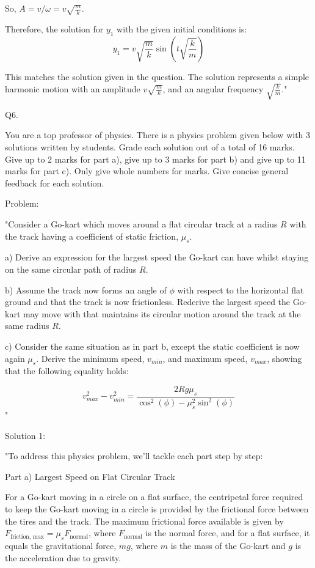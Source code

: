 So, \( A = v / \omega = v \sqrt{\frac{m}{k}} \).

Therefore, the solution for \( y_1 \) with the given initial conditions is:
\[ y_1 = v \sqrt{\frac{m}{k}} \sin(t \sqrt{\frac{k}{m}}) \]

This matches the solution given in the question. The solution represents a simple harmonic motion with an amplitude \( v \sqrt{\frac{m}{k}} \), and an angular frequency \( \sqrt{\frac{k}{m}} \)."



                           Q6. 

You are a top professor of physics. There is a physics problem given below with 3 solutions written by students. Grade each solution out of a total of 16 marks. Give up to 2 marks for part a), give up to 3 marks for part b) and give up to 11 marks for part c). Only give whole numbers for marks. Give concise general feedback for each solution.

Problem: 

"Consider a Go-kart which moves around a flat circular track at a radius \( R \) with the track having a coefficient of static friction, \( \mu_{s} \). 

a) Derive an expression for the largest speed the Go-kart can have whilst staying on the same circular path of radius \( R \). 
    
b) Assume the track now forms an angle of \( \phi \) with respect to the horizontal flat ground and that the track is now frictionless. Rederive the largest speed the Go-kart may move with that maintains its circular motion around the track at the same radius \( R \). 
    
c) Consider the same situation as in part b, except the static coefficient is now again \( \mu_{s} \). Derive the minimum speed, \( v_{min} \), and maximum speed, \( v_{max} \), showing that the following equality holds:
    
\[ 
v_{max}^{2} - v_{min}^{2} = \frac{2Rg\mu_{s}}{\cos^{2}(\phi) - \mu_{s}^{2}\sin^{2}(\phi)}
\]"

Solution 1:

"To address this physics problem, we'll tackle each part step by step:

Part a) Largest Speed on Flat Circular Track

For a Go-kart moving in a circle on a flat surface, the centripetal force required to keep the Go-kart moving in a circle is provided by the frictional force between the tires and the track. The maximum frictional force available is given by \( F_{\text{friction, max}} = \mu_s F_{\text{normal}} \), where \( F_{\text{normal}} \) is the normal force, and for a flat surface, it equals the gravitational force, \( mg \), where \( m \) is the mass of the Go-kart and \( g \) is the acceleration due to gravity.

